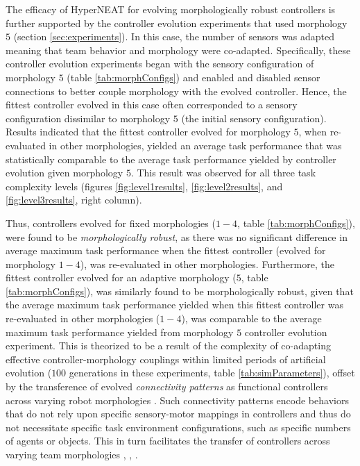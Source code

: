 \documentclass[conference]{IEEEtran}
\begin{document}
The efficacy of HyperNEAT for evolving morphologically robust controllers is further supported
by the controller evolution experiments that used morphology $5$ (section \ref{sec:experiments}).
In this case, the number of sensors was adapted meaning that team behavior and
morphology were co-adapted.
Specifically, these controller evolution experiments began with the sensory configuration of
morphology $5$ (table \ref{tab:morphConfigs}) and enabled and disabled sensor connections to
better couple morphology with the evolved controller.  Hence, the fittest
controller evolved in this case often corresponded to a sensory configuration
dissimilar to morphology $5$ (the initial sensory configuration).
Results indicated that the fittest controller evolved for morphology $5$, when re-evaluated in
other morphologies, yielded an average task performance that was statistically comparable to
the average task performance yielded by controller evolution given morphology $5$.
This result was observed for all three task complexity levels
(figures \ref{fig:level1results}, \ref{fig:level2results}, and \ref{fig:level3results}, right column).

Thus, controllers evolved for fixed morphologies ($1-4$, table \ref{tab:morphConfigs}), were
found to be \textit{morphologically robust}, as there was no significant difference in average maximum
task performance when the fittest controller (evolved for morphology $1-4$), was re-evaluated in other
morphologies.
Furthermore, the fittest controller evolved for an adaptive morphology ($5$, table \ref{tab:morphConfigs}),
was similarly found to be morphologically robust, given that the average maximum task performance
yielded when this fittest controller was re-evaluated in other morphologies ($1-4$), was comparable to
the average maximum task performance yielded from morphology $5$ controller evolution experiment.
This is theorized to be a result of the complexity of co-adapting effective controller-morphology
couplings \cite{PfeiferBongard2006} within limited periods of artificial evolution ($100$ generations in these experiments,
table \ref{tab:simParameters}), offset by the transference of evolved
\textit{connectivity patterns} \cite{GauciStanley2010} as functional controllers across varying
robot morphologies  \cite{RisiStanley2013}.
Such connectivity patterns encode behaviors that do not rely upon specific sensory-motor mappings in
controllers and thus do not necessitate specific task environment configurations,
such as specific numbers of agents or objects.
This in turn facilitates the transfer of controllers across varying team morphologies
\cite{verbancsics_evolving_2010}, \cite{DidiNitschke2016SSCI}, \cite{DidiNitschke2016}.
\end{document}
